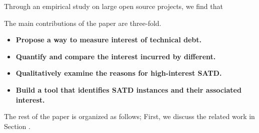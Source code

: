 Through an empirical study on  large open source projects, we find that 

 
The main contributions of the paper are three-fold.

\begin{itemize}
\item \textbf{Propose a way to measure interest of technical debt.} 
\item  \textbf{Quantify and compare the interest incurred by different.} 
\item  \textbf{Qualitatively examine the reasons for high-interest SATD.}
\item \textbf{Build a tool that identifies SATD instances and their associated interest.} 
\end{itemize}

The rest of the paper is organized as follows; First, we discuss the related work in Section . 